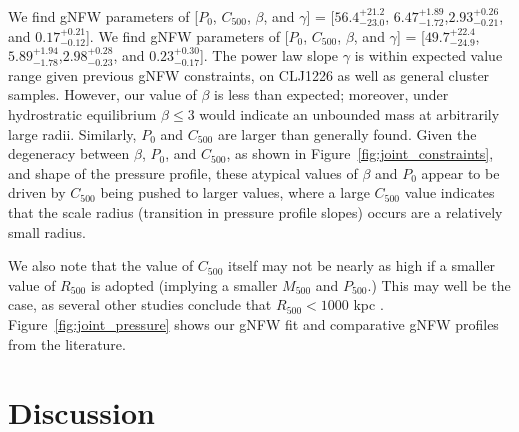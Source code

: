 \documentclass[twocolumn,traditabstract]{aa}
\begin{document}

We find gNFW parameters of [$P_0$, $C_{500}$, $\beta$, and $\gamma$] =
[$56.4_{-23.0}^{+21.2}$, $6.47_{-1.72}^{+1.89}$,$2.93_{-0.21}^{+0.26}$, and $0.17_{-0.12}^{+0.21}$].
We find gNFW parameters of [$P_0$, $C_{500}$, $\beta$, and $\gamma$] =
[$49.7_{-24.9}^{+22.4}$, $5.89_{-1.78}^{+1.94}$,$2.98_{-0.23}^{+0.28}$, and $0.23_{-0.17}^{+0.30}$].
The power law slope $\gamma$ is within expected value range given previous gNFW constraints,
on CLJ1226 as well as general cluster samples. However, our value of $\beta$ is less than expected;
moreover, under hydrostratic equilibrium $\beta \le 3$ would indicate an unbounded mass at arbitrarily
large radii. Similarly, $P_0$ and $C_{500}$ are larger than generally found.
Given the degeneracy between $\beta$, $P_0$, and $C_{500}$, as shown in Figure~\ref{fig:joint_constraints},
and shape of the pressure profile, these atypical
values of $\beta$ and  $P_0$ appear to be driven by $C_{500}$ being pushed to larger values, where a large $C_{500}$
value indicates that the scale radius (transition in pressure profile slopes) occurs are a relatively small radius.

We also note that the value of $C_{500}$ itself may not be nearly as high if a smaller value of $R_{500}$
is adopted (implying a smaller $M_{500}$ and $P_{500}$.) This may well be the case, as several other
studies conclude that $R_{500} < 1000$ kpc \citep[e.g][]{rumsey2016,mroczkowski2009}.
Figure~\ref{fig:joint_pressure} shows our gNFW fit and comparative gNFW profiles from the literature.

\section{Discussion}
\label{sec:discussion}
\end{document}
